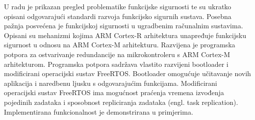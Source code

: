 \documentclass[utf8, diplomski, english, numeric]{fer}
\begin{document}
\begin{sazetak}

U radu je prikazan pregled problematike funkcijske sigurnosti te su ukratko opisani odgovarajući standardi razvoja funkcijsko sigurnih sustava. Posebna pažnja posvećena je funkcijskoj sigurnosti u ugradbenim računalnim sustavima. Opisani su mehanizmi kojima ARM Cortex-R arhitektura unapređuje funkcijsku sigurnost u odnosu na ARM Cortex-M arhitekturu. Razvijena je programska potpora za ostvarivanje redundancije na mikrokontroleru s ARM Cortex-M arhitekturom. Programska potpora sadržava vlastito razvijeni bootloader i modificirani operacijski sustav FreeRTOS. Bootloader omogućuje učitavanje novih aplikacija i naredbenu ljusku s odgovarajućim funkcijama. Modificirani operacijski sustav FreeRTOS ima mogućnost praćenja vremena izvođenja pojedinih zadataka i sposobnost repliciranja zadataka (engl. task replication). Implementirana funkcionalnost je demonstrirana u primjerima.

\end{sazetak}

\begin{appendices}


\end{appendices}
\end{document}
